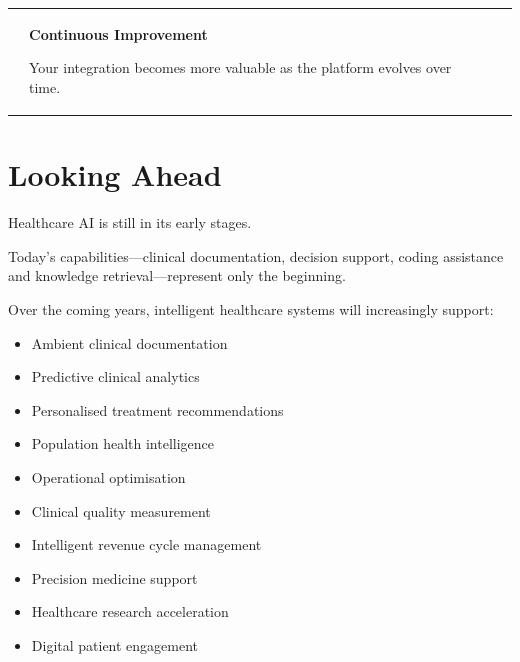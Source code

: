 \begin{center}
\begin{tabularx}{\textwidth}{XXXX}
&

\begin{partnerbox}

\centering

{\Large\textbf{Continuous Improvement}}

\vspace{2mm}

Your integration becomes more valuable as the platform evolves over time.

\end{partnerbox}

\end{tabularx}

\end{center}


\section{Looking Ahead}

Healthcare AI is still in its early stages.

Today's capabilities—clinical documentation, decision support, coding assistance and knowledge retrieval—represent only the beginning.

Over the coming years, intelligent healthcare systems will increasingly support:

\begin{itemize}

\item Ambient clinical documentation

\item Predictive clinical analytics

\item Personalised treatment recommendations

\item Population health intelligence

\item Operational optimisation

\item Clinical quality measurement

\item Intelligent revenue cycle management

\item Precision medicine support

\item Healthcare research acceleration

\item Digital patient engagement

\end{itemize}

